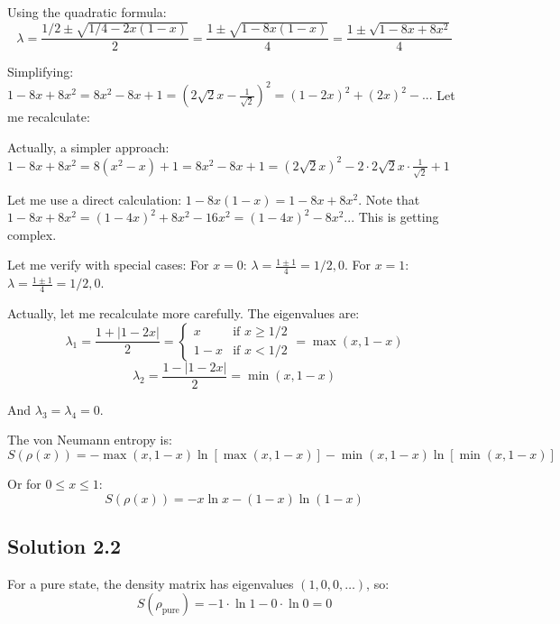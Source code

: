 \documentclass[11pt]{article}
\begin{document}
Using the quadratic formula:
\begin{equation*}
    \lambda = \frac{1/2 \pm \sqrt{1/4 - 2x(1-x)}}{2} = \frac{1 \pm \sqrt{1 - 8x(1-x)}}{4} = \frac{1 \pm \sqrt{1 - 8x + 8x^2}}{4}
\end{equation*}

Simplifying: $1 - 8x + 8x^2 = 8x^2 - 8x + 1 = (2\sqrt{2}x - \frac{1}{\sqrt{2}})^2 = (1 - 2x)^2 + (2x)^2 - ... $ Let me recalculate:

Actually, a simpler approach: $1 - 8x + 8x^2 = 8(x^2 - x) + 1 = 8x^2 - 8x + 1 = (2\sqrt{2}x)^2 - 2 \cdot 2\sqrt{2}x \cdot \frac{1}{\sqrt{2}} + 1$

Let me use a direct calculation: $1 - 8x(1-x) = 1 - 8x + 8x^2$. Note that $1 - 8x + 8x^2 = (1-4x)^2 + 8x^2 - 16x^2 = (1-4x)^2 - 8x^2$... This is getting complex.

Let me verify with special cases: For $x=0$: $\lambda = \frac{1 \pm 1}{4} = 1/2, 0$. For $x=1$: $\lambda = \frac{1 \pm 1}{4} = 1/2, 0$.

Actually, let me recalculate more carefully. The eigenvalues are:
\begin{equation*}
    \lambda_1 = \frac{1 + |1-2x|}{2} = \begin{cases} x & \text{if } x \geq 1/2 \\ 1-x & \text{if } x < 1/2 \end{cases} = \max(x, 1-x)
\end{equation*}
\begin{equation*}
    \lambda_2 = \frac{1 - |1-2x|}{2} = \min(x, 1-x)
\end{equation*}

And $\lambda_3 = \lambda_4 = 0$.

The von Neumann entropy is:
\begin{equation*}
    S(\rho(x)) = -\max(x,1-x)\ln[\max(x,1-x)] - \min(x,1-x)\ln[\min(x,1-x)]
\end{equation*}

Or for $0 \leq x \leq 1$:
\begin{equation*}
    S(\rho(x)) = -x\ln x - (1-x)\ln(1-x)
\end{equation*}

\subsection{Solution 2.2}

For a pure state, the density matrix has eigenvalues $(1, 0, 0, \ldots)$, so:
\begin{equation*}
    S(\rho_{\text{pure}}) = -1 \cdot \ln 1 - 0 \cdot \ln 0 = 0
\end{equation*}
\end{document}
